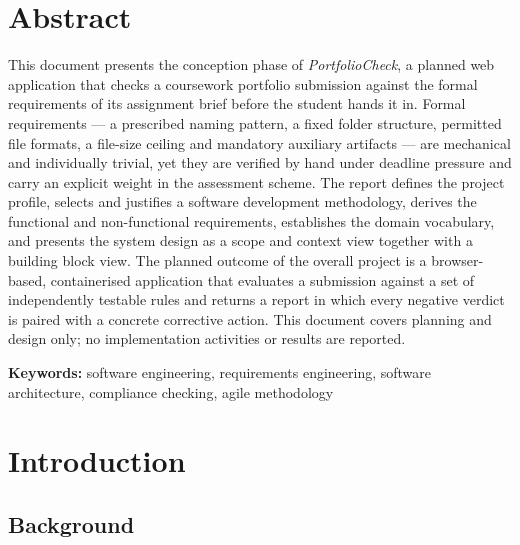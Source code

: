\documentclass[a4paper,11pt]{article}
\begin{document}
\section*{Abstract}

This document presents the conception phase of \textit{PortfolioCheck}, a
planned web application that checks a coursework portfolio submission against
the formal requirements of its assignment brief before the student hands it in.
Formal requirements --- a prescribed naming pattern, a fixed folder structure,
permitted file formats, a file-size ceiling and mandatory auxiliary artifacts
--- are mechanical and individually trivial, yet they are verified by hand under
deadline pressure and carry an explicit weight in the assessment scheme. The
report defines the project profile, selects and justifies a software development
methodology, derives the functional and non-functional requirements, establishes
the domain vocabulary, and presents the system design as a scope and context
view together with a building block view. The planned outcome of the overall
project is a browser-based, containerised application that evaluates a
submission against a set of independently testable rules and returns a report in
which every negative verdict is paired with a concrete corrective action. This
document covers planning and design only; no implementation activities or
results are reported.

\textbf{Keywords:} software engineering, requirements engineering, software
architecture, compliance checking, agile methodology

\newpage
\tableofcontents
\vspace{0.8cm}
\listoffigures
\vspace{0.4cm}
\listoftables
\newpage

\setcounter{page}{1}

\section{Introduction}\label{sec:intro}

\subsection{Background}\label{subsec:background}
\end{document}
